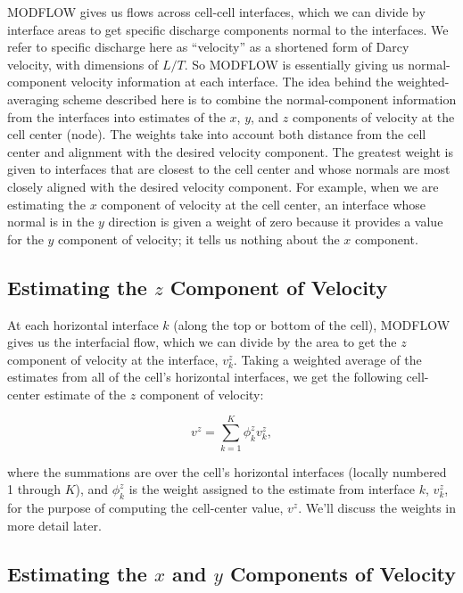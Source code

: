 \newcommand{\sign}{\text{sign}}
\newcommand{\matr}[1]{\mathbf{#1}}

MODFLOW gives us flows across cell-cell interfaces, which we can divide by interface areas to get specific discharge components normal to the interfaces. We refer to specific discharge here as ``velocity'' as a shortened form of Darcy velocity, with dimensions of $L/T$. So MODFLOW is essentially giving us normal-component velocity information at each interface. The idea behind the weighted-averaging scheme described here is to combine the normal-component information from the interfaces into estimates of the  $x$, $y$, and $z$ components of velocity at the cell center (node). The weights take into account both distance from the cell center and alignment with the desired velocity component.  The greatest weight is given to interfaces that are closest to the cell center and whose normals are most closely aligned with the desired velocity component. For example, when we are estimating the $x$ component of velocity at the cell center, an interface whose normal is in the $y$ direction is given a weight of zero because it provides a value for the $y$ component of velocity; it tells us nothing about the $x$ component.

\subsection{Estimating the $z$ Component of Velocity}

At each horizontal interface $k$ (along the top or bottom of the cell), MODFLOW gives us the interfacial flow, which we can divide by the area to get the $z$ component of velocity at the interface, $v_k^z$. Taking a weighted average of the estimates from all of the cell's horizontal interfaces, we get the following cell-center estimate of the $z$ component of velocity:

\begin{equation}
\label{vz}
v^z = \sum_{k=1}^K \phi_k^z v_k^z,
\end{equation}

\noindent where the summations are over the cell's horizontal interfaces (locally numbered 1 through $K$), and $\phi_k^z$ is the weight assigned to the estimate from interface  $k$, $v_k^z$, for the purpose of computing the cell-center value, $v^z$. We'll discuss the weights in more detail later.

\subsection{Estimating the $x$ and $y$ Components of Velocity}

